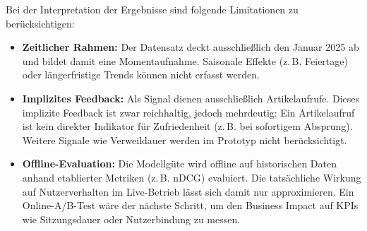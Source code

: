 Bei der Interpretation der Ergebnisse sind folgende Limitationen zu berücksichtigen:
\begin{itemize}
    \item \textbf{Zeitlicher Rahmen:} Der Datensatz deckt ausschließlich den Januar 2025 ab und bildet damit 
    eine Momentaufnahme. Saisonale Effekte (z.\,B. Feiertage) oder längerfristige Trends können nicht erfasst werden.
    \item \textbf{Implizites Feedback:} Als Signal dienen ausschließlich Artikelaufrufe. Dieses implizite Feedback ist 
    zwar reichhaltig, jedoch mehrdeutig: Ein Artikelaufruf ist kein direkter Indikator für Zufriedenheit 
    (z.\,B. bei sofortigem Absprung). Weitere Signale wie Verweildauer werden im Prototyp nicht berücksichtigt.
    \item \textbf{Offline-Evaluation:} Die Modellgüte wird offline auf historischen Daten anhand etablierter 
    Metriken (z.\,B. \ac{nDCG}) evaluiert. Die tatsächliche Wirkung auf Nutzerverhalten im 
    Live-Betrieb lässt sich damit nur approximieren. Ein Online-A/B-Test wäre der nächste Schritt, 
    um den Business Impact auf KPIs wie Sitzungsdauer oder Nutzerbindung zu messen.
\end{itemize}